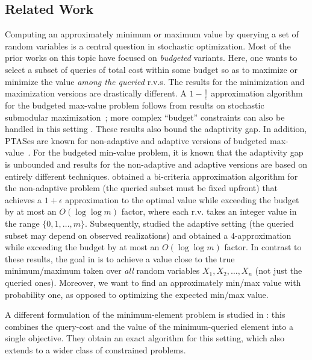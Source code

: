 \documentclass[11pt]{article}
\theoremstyle{remark}
\theoremstyle{plain}
\theoremstyle{remark}
\begin{document}
\subsection{Related Work}\label{subsec:related}
Computing an approximately  minimum or maximum value by querying a set of random variables is a central question in stochastic optimization. Most of the prior works on this topic have   focused on {\em budgeted} variants. Here, one wants to select a subset of queries of total cost within some budget so as to maximize or minimize the value {\em among the queried} r.v.s. 
The results for the minimization and maximization versions are drastically different. A $1-\frac1e$ approximation algorithm for the budgeted max-value problem   follows from results on stochastic submodular maximization~\cite{AsadpourN16}; more complex ``budget'' constraints can also be handled in this setting \cite{AdamczykSW16,GuptaNS17}. These results also bound the adaptivity gap. In addition,  PTASes are known for  non-adaptive and adaptive versions of budgeted max-value~\cite{FuLX18,SegevS21}.  For the budgeted min-value problem, it is known that the adaptivity gap is unbounded and results for the non-adaptive and adaptive versions  are based on entirely different techniques. \cite{goel2010probe} obtained a bi-criteria approximation algorithm for the non-adaptive problem (the queried subset must be fixed upfront) that achieves a $1+\epsilon$ approximation to the optimal value while exceeding the budget by at most an $O(\log\log m)$ factor, where each r.v. takes an integer value in the range $\{0,1,\dots, m\}$. Subsequently, \cite{wang2022probing} studied the adaptive setting (the queried subset may depend on observed realizations) and obtained a $4$-approximation  while exceeding the budget by at most an $O(\log\log m)$ factor. In contrast to these results, the  goal in \smq is to achieve a value close to the true minimum/maximum taken over {\em all} random variables $X_1, X_2, \dots, X_n$ (not just the queried ones). Moreover, we  want to find an  approximately min/max  value with probability one, as opposed to    optimizing   the expected min/max value.  

A different formulation of the minimum-element problem is studied in \cite{Singla18}: this combines the query-cost and the value of the minimum-queried element into a single objective. They obtain an exact algorithm for this setting, which also extends to a wider class of constrained problems.   
\end{document}
